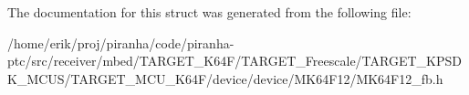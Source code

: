 The documentation for this struct was generated from the following file\+:\begin{DoxyCompactItemize}
\item 
/home/erik/proj/piranha/code/piranha-\/ptc/src/receiver/mbed/\+T\+A\+R\+G\+E\+T\+\_\+\+K64\+F/\+T\+A\+R\+G\+E\+T\+\_\+\+Freescale/\+T\+A\+R\+G\+E\+T\+\_\+\+K\+P\+S\+D\+K\+\_\+\+M\+C\+U\+S/\+T\+A\+R\+G\+E\+T\+\_\+\+M\+C\+U\+\_\+\+K64\+F/device/device/\+M\+K64\+F12/M\+K64\+F12\+\_\+fb.\+h\end{DoxyCompactItemize}
